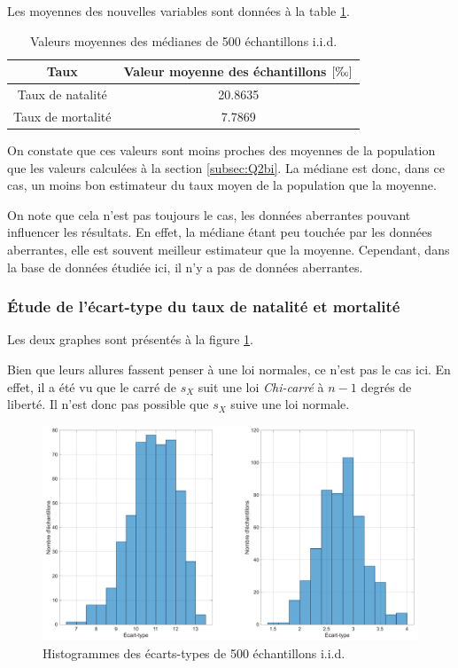 \documentclass[a4paper, 12pt]{article}
\begin{document}
	Les moyennes des nouvelles variables sont données à la table \ref{tab:Q2bii}.\par
	
	\begin{table}[!ht]
	    \centering
	    \begin{tabular}{|c|c|}
	        \hline
	        \textbf{Taux} & \textbf{Valeur moyenne des échantillons} \(\left [\text{\textperthousand} \right ]\)\\ \hline
	        \hline
	        Taux de natalité & \num{20.8635}\\ \hline
	        Taux de mortalité & \num{7.7869}\\ \hline
	    \end{tabular}
	    \caption{Valeurs moyennes des médianes de 500 échantillons i.i.d.}
	    \label{tab:Q2bii}
	\end{table}
	
	On constate que ces valeurs sont moins proches des moyennes de la population que les valeurs calculées à la section \ref{subsec:Q2bi}. La médiane est donc, dans ce cas, un moins bon estimateur du taux moyen de la population que la moyenne.\par
	
	On note que cela n'est pas toujours le cas, les données aberrantes pouvant influencer les résultats. En effet, la médiane étant peu touchée par les données aberrantes, elle est souvent meilleur estimateur que la moyenne. Cependant, dans la base de données étudiée ici, il n'y a pas de données aberrantes.
	
	\subsubsection{Étude de l'écart-type du taux de natalité et mortalité}
	Les deux graphes sont présentés à la figure \ref{fig:Q2biii}.
	
	Bien que leurs allures fassent penser à une loi normales, ce n'est pas le cas ici. En effet, il a été vu que le carré de \(s_X\) suit une loi \textit{Chi-carré} à \(n-1\) degrés de liberté. Il n'est donc pas possible que \(s_X\) suive une loi normale.\par
	
	\begin{figure}[!ht]
	    \centering
	    \includegraphics[width=\textwidth]{resources/pdf/figures/Q2biii.pdf}
	    \caption{Histogrammes des écarts-types de \num{500} échantillons i.i.d.}
	    \label{fig:Q2biii}
	\end{figure}
	
\end{document}
